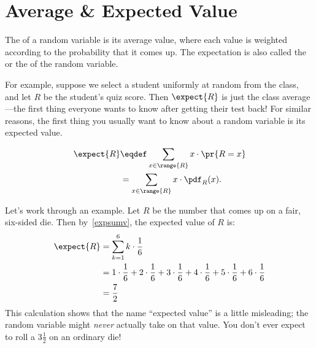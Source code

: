 \section{Average \& Expected Value}
The  of a random variable is its average value, where
each value is weighted according to the probability that it comes up.
The expectation is also called the  or the
 of the random variable.

For example, suppose we select a student uniformly at random from the
class, and let $R$ be the student's quiz score.  Then $\expect{R}$ is just
the class average ---the first thing everyone wants to know after getting
their test back!  For similar reasons, the first thing you usually want to
know about a random variable is its expected value.

\begin{definition}\label{expdef}
\begin{align}
\expect{R} &\eqdef \sum_{x \in \range{R}} x \cdot \pr{R = x}\label{expsumv}\\
           & = \sum_{x \in \range{R}} x \cdot \pdf_R(x).\notag
\end{align}
\end{definition}

Let's work through an example.  Let $R$ be the number that comes up on a
fair, six-sided die.  Then by~\eqref{expsumv}, the expected value of $R$
is:
%
\begin{align*}
\expect{R}
    & = \sum_{k=1}^6 k \cdot \frac{1}{6} \\
    & = 1 \cdot \frac{1}{6} + 2 \cdot \frac{1}{6} + 3 \cdot \frac{1}{6} +
        4 \cdot \frac{1}{6} + 5 \cdot \frac{1}{6} + 6 \cdot \frac{1}{6} \\
    & = \frac{7}{2}
\end{align*}
%
This calculation shows that the name ``expected value'' is a little
misleading; the random variable might \textit{never} actually take on that
value.  You don't ever expect to roll a $3 \frac{1}{2}$ on an ordinary
die!

